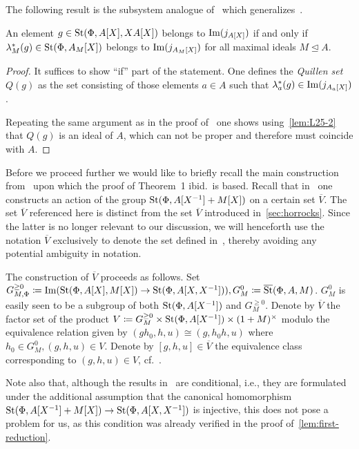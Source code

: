 The following result is the subsystem analogue of~\cite[Theorem~2]{LS17} which generalizes~\cite[Theorem~2.1]{Tu83}.
\begin{cor} \label{cor:QS-subsystem}
    An element $g \in \operatorname{St}(\Phi, A[X], XA[X])$ belongs to $\operatorname{Im}(j_{A[X]})$ if and only if
     $\lambda_M^*(g) \in \operatorname{St}(\Phi, A_M[X])$ belongs to $\operatorname{Im}(j_{A_M[X]})$ for all maximal ideals $M \trianglelefteq A$.
\end{cor}
\begin{proof}
    It suffices to show ``if'' part of the statement.
    One defines the \textit{Quillen set} $Q(g)$ as the set consisting of those elements $a \in A$
    such that $\lambda_a^*(g) \in \operatorname{Im}(j_{A_a[X]})$.

    Repeating the same argument as in the proof of~\cite[Theorem~2]{S15} one shows using~\cref{lem:L25-2}
     that $Q(g)$ is an ideal of $A$, which can not be proper and therefore must coincide with $A$.
\end{proof}

Before we proceed further we would like to briefly recall the main construction from~\cite{LS20} upon which
 the proof of Theorem~1 ibid.\ is based.
Recall that in~\cite{LS20} one constructs an action of the group $\operatorname{St}(\Phi, A[X^{-1}] + M[X])$ on a certain set $\overline{V}$.
The set $\overline{V}$ referenced here is distinct from the set $\overline{V}$ introduced in~\cref{sec:horrocks}.
Since the latter is no longer relevant to our discussion, we will henceforth use the notation $\overline{V}$ exclusively to denote the set defined in~\cite{LS20},
 thereby avoiding any potential ambiguity in notation.

The construction of $\overline{V}$ proceeds as follows.
Set $G_{M, \Phi}^{\geq 0} \coloneqq \operatorname{Im}(\operatorname{St}(\Phi, A[X], M[X]) \to \operatorname{St}(\Phi, A[X, X^{-1}])), G_M^0 \coloneqq \overline{\operatorname{St}}(\Phi, A, M)$.
$G_M^0$ is easily seen to be a subgroup of both $\operatorname{St}(\Phi, A[X^{-1}])$ and $G_M^{\geq 0}$.
Denote by $\overline{V}$ the factor set of the product $V \coloneqq G_M^{\geq 0} \times \operatorname{St}(\Phi, A[X^{-1}]) \times (1 + M)^\times$
modulo the equivalence relation given by $(gh_0, h, u) \cong (g, h_0h, u)$ where $h_0 \in G_M^0, (g, h, u) \in V.$
Denote by $[g, h, u] \in \overline{V}$ the equivalence class corresponding to $(g, h, u)\in V$, cf.~\cite[\S~5.4]{LS20}.

Note also that, although the results in~\cite[\S~5.5]{LS20} are conditional,
 i.e., they are formulated under the additional assumption that the canonical homomorphism $\operatorname{St}(\Phi, A[X^{-1}] + M[X]) \to \operatorname{St}(\Phi, A[X, X^{-1}])$ is injective,
 this does not pose a problem for us, as this condition was already verified in the proof of~\cref{lem:first-reduction}.

